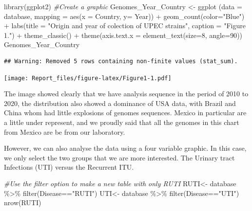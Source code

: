 \documentclass[
]{article}
\newenvironment{Shaded}{\begin{snugshade}}{\end{snugshade}}
\newcommand{\AttributeTok}[1]{\textcolor[rgb]{0.77,0.63,0.00}{#1}}
\newcommand{\CommentTok}[1]{\textcolor[rgb]{0.56,0.35,0.01}{\textit{#1}}}
\newcommand{\DecValTok}[1]{\textcolor[rgb]{0.00,0.00,0.81}{#1}}
\newcommand{\FunctionTok}[1]{\textcolor[rgb]{0.00,0.00,0.00}{#1}}
\newcommand{\NormalTok}[1]{#1}
\newcommand{\OtherTok}[1]{\textcolor[rgb]{0.56,0.35,0.01}{#1}}
\newcommand{\SpecialCharTok}[1]{\textcolor[rgb]{0.00,0.00,0.00}{#1}}
\newcommand{\StringTok}[1]{\textcolor[rgb]{0.31,0.60,0.02}{#1}}
\begin{document}
\begin{Shaded}
\begin{Highlighting}[]
\FunctionTok{library}\NormalTok{(ggplot2)}
\CommentTok{\#Create a graphic}
\NormalTok{Genomes\_Year\_Country }\OtherTok{\textless{}{-}} \FunctionTok{ggplot}\NormalTok{ (}\AttributeTok{data =}\NormalTok{ database, }\AttributeTok{mapping =} \FunctionTok{aes}\NormalTok{(}\AttributeTok{x =}\NormalTok{ Country, }\AttributeTok{y=}\NormalTok{ Year)) }\SpecialCharTok{+} \FunctionTok{geom\_count}\NormalTok{(}\AttributeTok{color=}\StringTok{"Blue"}\NormalTok{) }\SpecialCharTok{+} \FunctionTok{labs}\NormalTok{(}\AttributeTok{title =} \StringTok{"Origin and year of colection of UPEC strains"}\NormalTok{, }\AttributeTok{caption =} \StringTok{"Figure 1."}\NormalTok{) }\SpecialCharTok{+} \FunctionTok{theme\_classic}\NormalTok{() }\SpecialCharTok{+} \FunctionTok{theme}\NormalTok{(}\AttributeTok{axis.text.x =} \FunctionTok{element\_text}\NormalTok{(}\AttributeTok{size=}\DecValTok{8}\NormalTok{, }\AttributeTok{angle=}\DecValTok{90}\NormalTok{))}
\NormalTok{Genomes\_Year\_Country}
\end{Highlighting}
\end{Shaded}

\begin{verbatim}
## Warning: Removed 5 rows containing non-finite values (stat_sum).
\end{verbatim}

\texttt{[image: Report\_files/figure-latex/Figure1-1.pdf]}

The image showed clearly that we have analysis sequence in the period of
2010 to 2020, the distribution also showed a dominance of USA data, with
Brazil and China whom had little explosions of genomes sequences. Mexico
in particular are a little under represent, and we proudly said that all
the genomes in this chart from Mexico are be from our laboratory.

However, we can also analyse the data using a four variable graphic. In
this case, we only select the two groups that we are more interested.
The Urinary tract Infections (UTI) versus the Recurrent ITU.

\begin{Shaded}
\begin{Highlighting}[]
\CommentTok{\#Use the filter option to make a new table with only RUTI }
\NormalTok{RUTI}\OtherTok{\textless{}{-}}\NormalTok{ database }\SpecialCharTok{\%\textgreater{}\%} \FunctionTok{filter}\NormalTok{(Disease}\SpecialCharTok{==}\StringTok{"RUTI"}\NormalTok{)}
\NormalTok{UTI}\OtherTok{\textless{}{-}}\NormalTok{ database }\SpecialCharTok{\%\textgreater{}\%} \FunctionTok{filter}\NormalTok{(Disease}\SpecialCharTok{==}\StringTok{"UTI"}\NormalTok{)}
\FunctionTok{nrow}\NormalTok{(RUTI)}
\end{Highlighting}
\end{Shaded}
\end{document}
